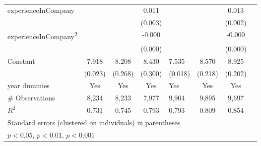 \begin{longtable}{l*{3}{c}|l*{3}{c}}
		experienceInCompany &                     &                     &       0.011\sym{***}&                     &                     &       0.013\sym{***}\\
		&                     &                     &     (0.003)         &                     &                     &     (0.002)         \\
		experienceInCompany\textsuperscript{2}&                     &                     &      -0.000\sym{*}  &                     &                     &      -0.000\sym{***}\\
		&                     &                     &     (0.000)         &                     &                     &     (0.000)         \\
		Constant            &       7.918\sym{***}&       8.208\sym{***}&       8.430\sym{***}&       7.535\sym{***}&       8.570\sym{***}&       8.925\sym{***}\\
		&     (0.023)         &     (0.268)         &     (0.300)         &     (0.018)         &     (0.218)         &     (0.202)         \\
		year dummies        &         Yes         &         Yes         &         Yes         &         Yes         &         Yes         &         Yes         \\
		\midrule
	\#	Observations        &        8,234         &        8,233         &        7,977         &        9,904         &        9,895         &        9,697         \\
		 \(R^{2}\)  &       0.731         &       0.745         &       0.793         &       0.793         &       0.809         &       0.854         \\
		\bottomrule
		\multicolumn{7}{l}{\footnotesize Standard errors (clustered on individuals) in parentheses}\\
		\multicolumn{7}{l}{\footnotesize \sym{*} \(p<0.05\),
          \sym{**} \(p<0.01\), \sym{***} \(p<0.001\)}
          \label{tab:ru_wage_full}
	\end{longtable}
\industry\\
\occupation
